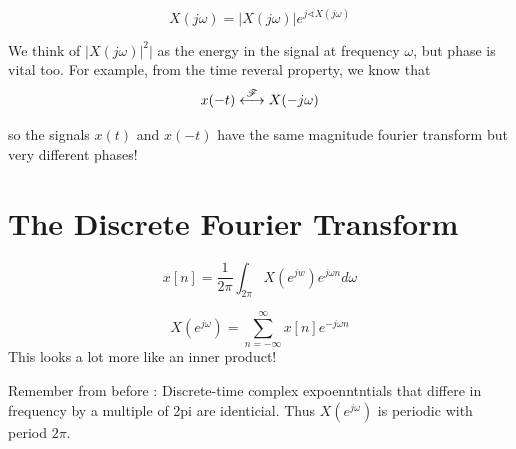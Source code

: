 \[
X(j\omega) = |X(j\omega)| e^{j\sphericalangle X(j\omega)}
\]

We think of $|X(j\omega)|^2|$ as the energy in the signal at frequency $\omega$, 
but phase is vital too. For example, from the time reveral property, we 
know that 
\[
x(-t)  \stackrel{\mathscr{F}}{\longleftrightarrow} X(-j\omega)
\]

so the signals $x(t)$ and $x(-t)$ have the same magnitude fourier transform but 
very different phases! 


\section{The Discrete Fourier Transform}

\[
x[n] = \frac{1}{2\pi}\int_{2\pi} X(e^{jw})e^{j\omega n} d\omega
\]

\[
X(e^{j\omega}) = \sum_{n=-\infty}^{\infty} x[n] e^{-j\omega n}
\]
This looks a lot more like an inner product!

Remember from before : Discrete-time complex expoenntntials that differe in frequency by a multiple of 2pi are identicial. Thus $X(e^{j\omega})$ is periodic with period $2\pi$. 
















